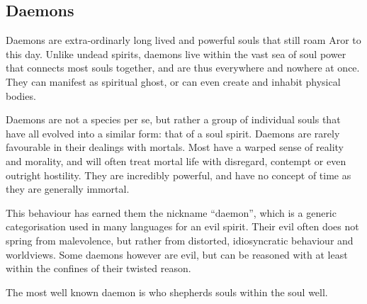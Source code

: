 \subsection{Daemons}
\label{sec:Daemons}

Daemons are extra-ordinarly long lived and powerful souls that still roam
Aror to this day. Unlike undead spirits, daemons live within the vast sea
of soul power that connects most souls together, and are thus everywhere and
nowhere at once. They can manifest as spiritual ghost, or can even create
and inhabit physical bodies.

Daemons are not a species per se, but rather a group of individual souls that
have all evolved into a similar form: that of a soul spirit. Daemons are
rarely favourable in their dealings with mortals. Most have a warped sense of
reality and morality, and will often treat mortal life with disregard,
contempt or even outright hostility. They are incredibly powerful, and have
no concept of time as they are generally immortal.

This behaviour has earned them the nickname ``daemon'', which is a generic
categorisation used in many languages for an evil spirit. Their evil often
does not spring from malevolence, but rather from distorted, idiosyncratic
behaviour and worldviews. Some daemons however are evil, but can be reasoned
with at least within the confines of their twisted reason.

The most well known daemon is  who shepherds souls within
the soul well.
